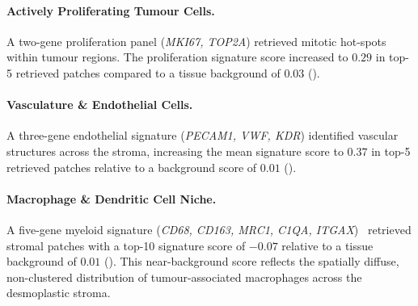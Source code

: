 \documentclass[pdflatex,sn-mathphys-num]{sn-jnl}%
\theoremstyle{thmstyleone}%
\theoremstyle{thmstyletwo}%
\theoremstyle{thmstylethree}%
\begin{document}
\paragraph{\textbf{Actively Proliferating Tumour Cells.}}
A two-gene proliferation panel (\textit{MKI67, TOP2A}) retrieved mitotic hot-spots within tumour regions. The proliferation signature score increased to $0.29$ in top-5 retrieved patches compared to a tissue background of $0.03$ ().

\paragraph{\textbf{Vasculature \& Endothelial Cells.}}
A three-gene endothelial signature (\textit{PECAM1, VWF, KDR}) identified vascular structures across the stroma, increasing the mean signature score to $0.37$ in top-5 retrieved patches relative to a background score of $0.01$ ().

\paragraph{\textbf{Macrophage \& Dendritic Cell Niche.}}
A five-gene myeloid signature (\textit{CD68, CD163, MRC1, C1QA, ITGAX})~\cite{elfstrum2024defining} retrieved stromal patches with a top-10 signature score of $-0.07$ relative to a tissue background of $0.01$ (). This near-background score reflects the spatially diffuse, non-clustered distribution of tumour-associated macrophages across the desmoplastic stroma.
\end{document}
